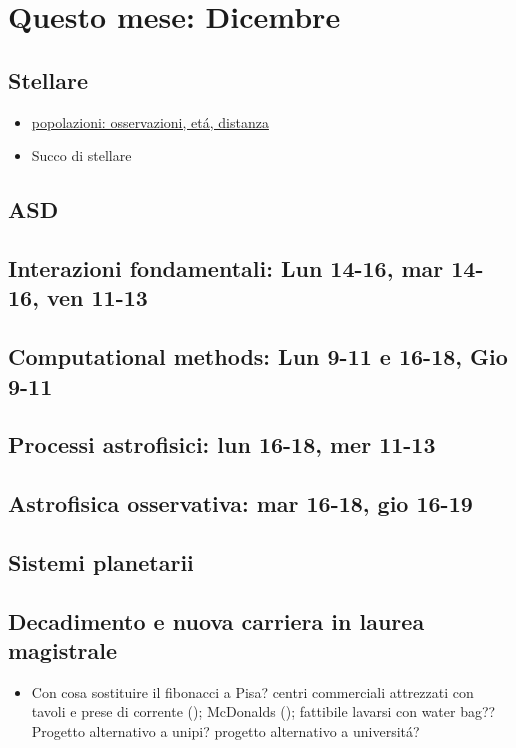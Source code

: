 \documentclass[main.tex]{subfiles}
\begin{document}
\chapter{Questo mese: Dicembre }
\section{Stellare}
\begin{itemize}
\item \href{http://campus.unibo.it/111203/1/pop1_2013.pptx.pdf}{popolazioni: osservazioni, et\'a, distanza}
\item Succo di stellare
\end{itemize}

\section{ASD}

\section{Interazioni fondamentali: Lun 14-16, mar 14-16, ven 11-13}

\section{Computational methods: Lun 9-11 e 16-18, Gio 9-11}

\section{Processi astrofisici: lun 16-18, mer 11-13}

\section{Astrofisica osservativa: mar 16-18, gio 16-19}

\section{Sistemi planetarii}

\section{Decadimento e nuova carriera in laurea magistrale}
\begin{itemize}

\item Con cosa sostituire il fibonacci a Pisa? centri commerciali attrezzati con tavoli e prese di corrente ();  
McDonalds (); fattibile lavarsi con water bag??
Progetto alternativo a unipi? progetto alternativo a universit\'a?

\end{itemize}
\end{document}
